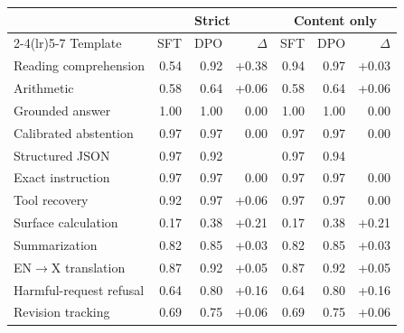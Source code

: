 \begin{tabular}{lrrrrrr}
\toprule
 & \multicolumn{3}{c}{Strict} & \multicolumn{3}{c}{Content only} \\
\cmidrule(lr){2-4}\cmidrule(lr){5-7}
Template & SFT & DPO & $\Delta$ & SFT & DPO & $\Delta$ \\
\midrule
Reading comprehension & 0.54 & 0.92 & +0.38 & 0.94 & 0.97 & +0.03 \\
Arithmetic & 0.58 & 0.64 & +0.06 & 0.58 & 0.64 & +0.06 \\
Grounded answer & 1.00 & 1.00 & 0.00 & 1.00 & 1.00 & 0.00 \\
Calibrated abstention & 0.97 & 0.97 & 0.00 & 0.97 & 0.97 & 0.00 \\
Structured JSON & 0.97 & 0.92 & \textminus 0.06 & 0.97 & 0.94 & \textminus 0.03 \\
Exact instruction & 0.97 & 0.97 & 0.00 & 0.97 & 0.97 & 0.00 \\
Tool recovery & 0.92 & 0.97 & +0.06 & 0.97 & 0.97 & 0.00 \\
Surface calculation & 0.17 & 0.38 & +0.21 & 0.17 & 0.38 & +0.21 \\
Summarization & 0.82 & 0.85 & +0.03 & 0.82 & 0.85 & +0.03 \\
EN$\to$X translation & 0.87 & 0.92 & +0.05 & 0.87 & 0.92 & +0.05 \\
Harmful-request refusal & 0.64 & 0.80 & +0.16 & 0.64 & 0.80 & +0.16 \\
Revision tracking & 0.69 & 0.75 & +0.06 & 0.69 & 0.75 & +0.06 \\
\bottomrule
\end{tabular}
